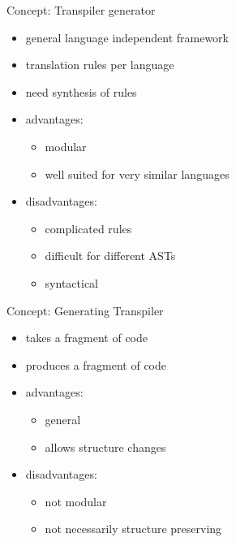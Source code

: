 \documentclass[aspectratio=169, handout]{beamer}
\begin{document}
    \begin{frame}{Concept: Transpiler generator}
    \begin{itemize}
        \item general language independent framework
        \item translation rules per language 
        \item need synthesis of rules \pause
        \item advantages:
            \begin{itemize}
                \item modular
                \item well suited for very similar languages
            \end{itemize} \pause
        \item disadvantages: 
            \begin{itemize}
                \item complicated rules
                \item difficult for different ASTs
                \item syntactical
            \end{itemize}
    \end{itemize}
    \end{frame}
    
    \begin{frame}{Concept: Generating Transpiler}
    \begin{itemize}
        \item takes a fragment of code
        \item produces a fragment of code \pause
        \item advantages:
            \begin{itemize}
                \item general
                \item allows structure changes
            \end{itemize} \pause
        \item disadvantages: 
            \begin{itemize}
                \item not modular
                \item not necessarily structure preserving
            \end{itemize}
    \end{itemize}
    \end{frame}
    
\end{document}
